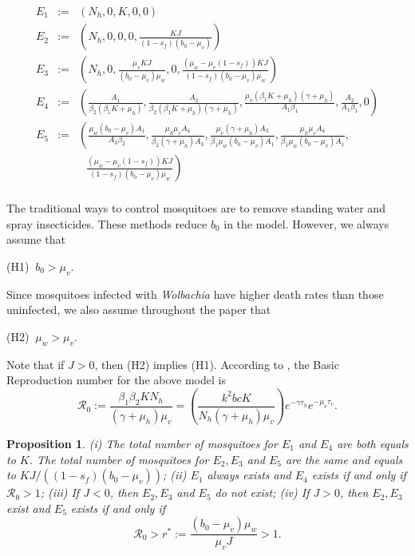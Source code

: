 \documentclass[12pt,leqno]{article}
\newcommand{\brn}{\mathcal{R}_0}
\newtheorem{Proposition}[Theorem]{Proposition}%
\begin{document}
\begin{eqnarray*}
E_1 &:=& (N_h,0,K,0,0)\\
E_2 &:=& \left(N_h,0,0,0,\frac{KJ}{(1-s_f)(b_0-\mu_v)}\right)\\
E_3 &:=& \left(N_h,0,\frac{\mu_v KJ}{(b_0-\mu_v)\mu_w},0,
\frac{(\mu_w-\mu_v(1-s_f))KJ}{(1-s_f)(b_0-\mu_v)\mu_w}\right)\\
E_4 &:=& \left(\frac{A_1}{\beta_2(\beta_1K+\mu_h)},\frac{A_2}{\beta_2(\beta_1K+\mu_h)(\gamma+\mu_h)},
\frac{\mu_v(\beta_1K+\mu_h)(\gamma+\mu_h)}{A_1\beta_1},\frac{A_2}{A_1\beta_1},0\right)\\
E_5 &:=& \left(\frac{\mu_w(b_0-\mu_v)A_1}{A_3\beta_2},\frac{\mu_h\mu_vA_4}{\beta_2(\gamma+\mu_h)A_3},\frac{\mu_v(\gamma+\mu_h)A_3}{\beta_1\mu_w(b_0-\mu_v)A_1},\frac{\mu_h\mu_vA_4}{\beta_1\mu_w(b_0-\mu_v)A_1},\right.\\
& &\;\;\left.\,\frac{(\mu_w-\mu_v(1-s_f))KJ}{(1-s_f)(b_0-\mu_v)\mu_w}\right)\\
\end{eqnarray*}

The traditional ways to control mosquitoes are to remove standing water and spray insecticides. These methods reduce $b_0$ in the model. However, we always assume that\smallskip

(H1)$\;\;b_0 > \mu_v$.\smallskip

\noindent Since mosquitoes infected with {\it Wolbachia} have higher death rates than those uninfected, we also assume throughout the paper that \smallskip

(H2)$\;\;\mu_w > \mu_v$.\smallskip

\noindent Note that if $J>0$, then (H2) implies (H1). According to \citep[display (2)]{Ruan2008}, the Basic Reproduction number for the above model is
$$
\brn := \displaystyle\frac{\beta_1\beta_2KN_h}{(\gamma+\mu_h)\mu_v} = \left(\displaystyle\frac{k^2bcK }{N_h(\gamma+\mu_h)\mu_v}\right)e^{-\gamma\tau_h} e^{-\mu_v\tau_v}.
$$
\begin{Proposition}\label{totaldengue}
(i) The total number of mosquitoes for $E_1$ and $E_4$ are both equals to $K$. The total number of mosquitoes for $E_2, E_3$ and $E_5$ are the same and equals to $KJ/((1-s_f)(b_0-\mu_v))$; (ii) $E_1$ always exists and $E_4$ exists if and only if $\mathcal{R}_0>1$; (iii) If $J < 0$, then $E_2, E_3$ and $E_5$ do not exist; (iv) If $J > 0$, then $E_2, E_3$ exist and $E_5$ exists if and only if 
\begin{equation}\label{A4pos}
\mathcal{R}_0 > r^* := \displaystyle\frac{(b_0-\mu_v)\mu_w}{\mu_vJ} > 1.
\end{equation}
\end{Proposition}
\end{document}
